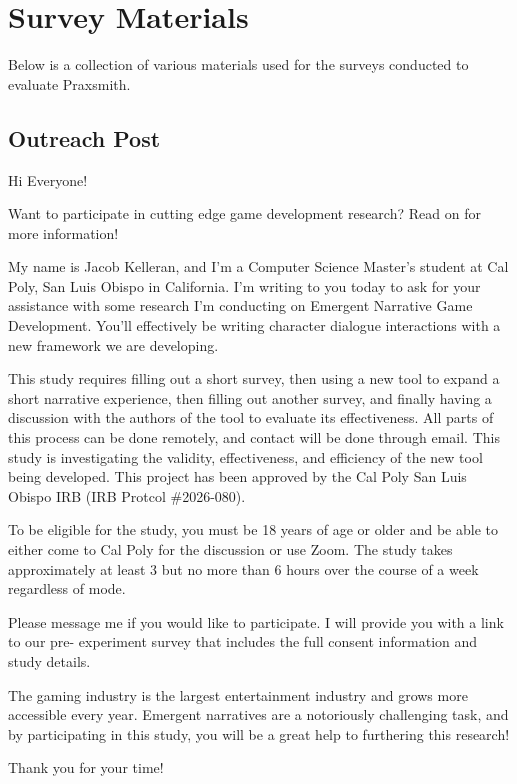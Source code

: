 \chapter{Survey Materials} \label{sec:SurveyMaterials}

Below is a collection of various materials used for the surveys conducted to evaluate
Praxsmith.

\section{Outreach Post}

Hi Everyone!

Want to participate in cutting edge game development research? Read on for more
information!

My name is Jacob Kelleran, and I'm a Computer Science Master's student at Cal Poly, San Luis
Obispo in California. I'm writing to you today to ask for your assistance with some research I'm
conducting on Emergent Narrative Game Development. You'll effectively be writing character
dialogue interactions with a new framework we are developing.

This study requires filling out a short survey, then using a new tool to expand a short narrative
experience, then filling out another survey, and finally having a discussion with the authors of the
tool to evaluate its effectiveness. All parts of this process can be done remotely, and contact
will be done through email. This study is investigating the validity, effectiveness, and efficiency of
the new tool being developed. This project has been approved by the Cal Poly San Luis Obispo
IRB (IRB Protcol \#2026-080).

To be eligible for the study, you must be 18 years of age or older and be able to either come to Cal
Poly for the discussion or use Zoom. The study takes approximately at least 3 but no more than 6
hours over the course of a week regardless of mode.

Please message me if you would like to participate. I will provide you with a link to our pre-
experiment survey that includes the full consent information and study details.

The gaming industry is the largest entertainment industry and grows more accessible every year.
Emergent narratives are a notoriously challenging task, and by participating in this study, you will
be a great help to furthering this research!

Thank you for your time!

